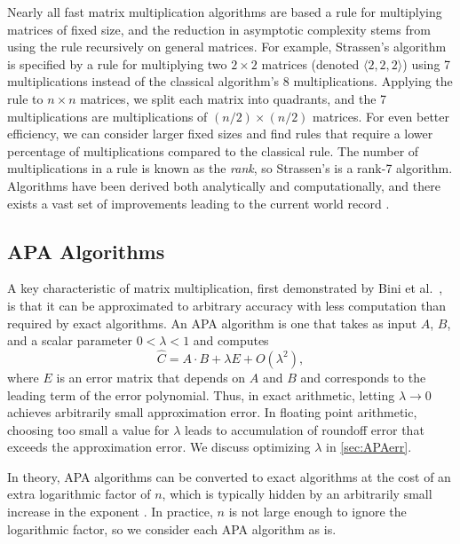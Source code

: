 \documentclass[sigconf,review,anonymous]{acmart}
\newcommand{\dims}[1]{\langle #1 \rangle}
\begin{document}
Nearly all fast matrix multiplication algorithms are based a rule for multiplying matrices of fixed size, and the reduction in asymptotic complexity stems from using the rule recursively on general matrices.
For example, Strassen's algorithm is specified by a rule for multiplying two $2\times2$ matrices (denoted $\dims{2,2,2}$) using 7 multiplications instead of the classical algorithm's 8 multiplications.
Applying the rule to $n\times n$ matrices, we split each matrix into quadrants, and the 7 multiplications are multiplications of $(n/2)\times (n/2)$ matrices.
For even better efficiency, we can consider larger fixed sizes and find rules that require a lower percentage of multiplications compared to the classical rule.
The number of multiplications in a rule is known as the \emph{rank}, so Strassen's is a rank-7 algorithm.
Algorithms have been derived both analytically and computationally, and there exists a vast set of improvements leading to the current world record \cite{Pan84,CW87,Williams12,AW21}.

\subsection{APA Algorithms}
\label{sec:APAalgs}

A key characteristic of matrix multiplication, first demonstrated by Bini et al.~\cite{BCRL79}, is that it can be approximated to arbitrary accuracy with less computation than required by exact algorithms.
An APA algorithm is one that takes as input $A$, $B$, and a scalar parameter $0<\lambda<1$ and computes 
\begin{equation}
\label{eq:APAapprox}
\hat C = A\cdot B + \lambda E + O(\lambda^2),
\end{equation}
where $E$ is an error matrix that depends on $A$ and $B$ and corresponds to the leading term of the error polynomial.
Thus, in exact arithmetic, letting $\lambda \rightarrow 0$ achieves arbitrarily small approximation error.
In floating point arithmetic, choosing too small a value for $\lambda$ leads to accumulation of roundoff error that exceeds the approximation error.
We discuss optimizing $\lambda$ in \cref{sec:APAerr}.

In theory, APA algorithms can be converted to exact algorithms at the cost of an extra logarithmic factor of $n$, which is typically hidden by an arbitrarily small increase in the exponent \cite{Bini80}.
In practice, $n$ is not large enough to ignore the logarithmic factor, so we consider each APA algorithm as is.
\end{document}
